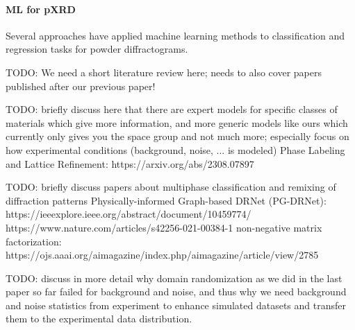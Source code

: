 \paragraph{ML for pXRD} Several approaches have applied machine learning methods to classification and regression tasks for powder diffractograms.

TODO: We need a short literature review here; needs to also cover papers published after our previous paper!

TODO: briefly discuss here that there are expert models for specific classes of materials which give more information, and more generic models like ours which currently only gives you the space group and not much more; especially focus on how experimental conditions (background, noise, ... is modeled)
Phase Labeling and Lattice Refinement: https://arxiv.org/abs/2308.07897


TODO: briefly discuss papers about multiphase classification and remixing of diffraction patterns
Physically-informed Graph-based DRNet (PG-DRNet): https://ieeexplore.ieee.org/abstract/document/10459774/
https://www.nature.com/articles/s42256-021-00384-1
non-negative matrix factorization: https://ojs.aaai.org/aimagazine/index.php/aimagazine/article/view/2785

TODO: discuss in more detail why domain randomization as we did in the last paper so far failed for background and noise, and thus why we need background and noise statistics from experiment to enhance simulated datasets and transfer them to the experimental data distribution.
